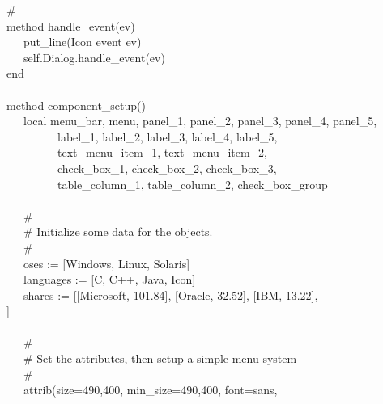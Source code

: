 {\>   \# \\
\>   method handle\_event(ev) \\
\>   \ \ \ put\_line({\textquotedbl}Icon event {\textquotedbl}
{\textbar}{\textbar} ev) \\
\>   \ \ \ self.Dialog.handle\_event(ev) \\
\>   end \\
\ \\
\>   method component\_setup() \\
\>   \ \ \ local menu\_bar, menu, panel\_1, panel\_2, panel\_3, panel\_4, panel\_5, \\
\>   \ \ \ \ \ \ \ \ \ label\_1, label\_2, label\_3, label\_4, label\_5, \\
\>   \ \ \ \ \ \ \ \ \ text\_menu\_item\_1, text\_menu\_item\_2, \\
\>   \ \ \ \ \ \ \ \ \ check\_box\_1, check\_box\_2, check\_box\_3, \\
\>   \ \ \ \ \ \ \ \ \ table\_column\_1, table\_column\_2, check\_box\_group \\
\ \\
\>   \ \ \ \# \\
\>   \ \ \ \# Initialize some data for the objects. \\
\>   \ \ \ \# \\
\>   \ \ \ oses := [{\textquotedbl}Windows{\textquotedbl},
{\textquotedbl}Linux{\textquotedbl},
{\textquotedbl}Solaris{\textquotedbl}] \\
\>   \ \ \ languages := [{\textquotedbl}C{\textquotedbl},
{\textquotedbl}C++{\textquotedbl}, {\textquotedbl}Java{\textquotedbl},
{\textquotedbl}Icon{\textquotedbl}] \\
\>   \ \ \ shares := [[{\textquotedbl}Microsoft{\textquotedbl},
{\textquotedbl}101.84{\textquotedbl}],
[{\textquotedbl}Oracle{\textquotedbl},
{\textquotedbl}32.52{\textquotedbl}],
[{\textquotedbl}IBM{\textquotedbl},
{\textquotedbl}13.22{\textquotedbl}], \\
\>\>] \\
\ \\
\>   \ \ \ \# \\
\>   \ \ \ \# Set the attributes, then setup a simple menu system \\
\>   \ \ \ \# \\
\>   \ \ \ attrib({\textquotedbl}size=490,400{\textquotedbl},
{\textquotedbl}min\_size=490,400{\textquotedbl},
{\textquotedbl}font=sans{\textquotedbl}, \\
}
